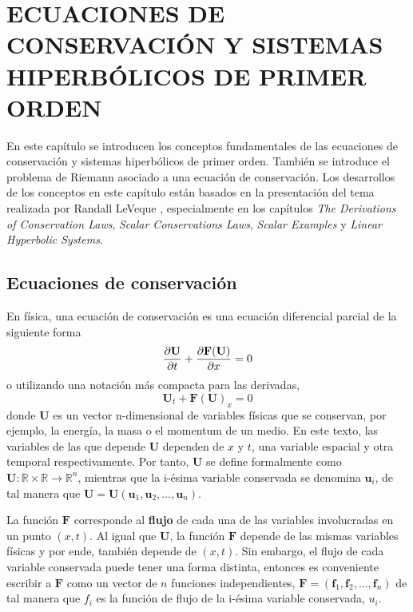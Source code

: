 \chapter{ECUACIONES DE CONSERVACIÓN Y SISTEMAS HIPERBÓLICOS DE PRIMER ORDEN}
En este capítulo se introducen los conceptos fundamentales de las ecuaciones de conservación y sistemas hiperbólicos de primer orden. También se introduce el problema de Riemann asociado a una ecuación de conservación. Los desarrollos de los conceptos en este capítulo están basados en la presentación del tema realizada por Randall LeVeque \cite{LeVeque}, especialmente en los capítulos \textit{The Derivations of Conservation Laws}, \textit{Scalar Conservations Laws}, \textit{Scalar Examples} y \textit{Linear Hyperbolic Systems}.
\section{Ecuaciones de conservación}
\label{sec:ecuaciones-de-conservacion}
En física, una ecuación de conservación es una ecuación diferencial parcial de la siguiente forma
\begin{equation}
	\pdv{\mathbf{U}}{t} + \pdv{\mathbf{F}(\mathbf{U})}{x} = 0
	\label{eq:conservacion}
\end{equation}
o utilizando una notación más compacta para las derivadas,
\begin{equation}
	\mathbf{U}_{t} + \mathbf{F}(\mathbf{U})_{x} = 0
	\label{eq:conserv-deriv-short}
\end{equation}
donde $\mathbf{U}$ es un vector n-dimensional de variables físicas que se conservan, por ejemplo, la energía, la masa o el momentum de un medio. En este texto, las variables de las que depende $\mathbf{U}$ dependen de $x$ y $t$, una variable espacial y otra temporal respectivamente. Por tanto, $\mathbf{U}$ se define formalmente como $\mathbf{U} : \mathbb{R} \times  \mathbb{R} \rightarrow \mathbb{R}^{n}$, mientras que la i-ésima variable conservada se denomina $\mathbf{u}_{i}$, de tal manera que $\mathbf{U} = \mathbf{U}(\mathbf{u}_{1}, \mathbf{u}_{2}, \dots, \mathbf{u}_{n})$. 

La función $\mathbf{F}$ corresponde al \textbf{flujo} de cada una de las variables involucradas en un punto $(x,t)$. Al igual que $\mathbf{U}$, la función $\mathbf{F}$ depende de las mismas variables físicas y por ende, también depende de $(x,t)$. Sin embargo, el flujo de cada variable conservada puede tener una forma distinta, entonces es conveniente escribir a $\mathbf{F}$ como un vector de $n$ funciones independientes, $\mathbf{F} = (\mathbf{f}_{1}, \mathbf{f}_{2}, \dots, \mathbf{f}_{n})$
de tal manera que $f_i$ es la función de flujo de la i-ésima variable conservada, $u_i$.

